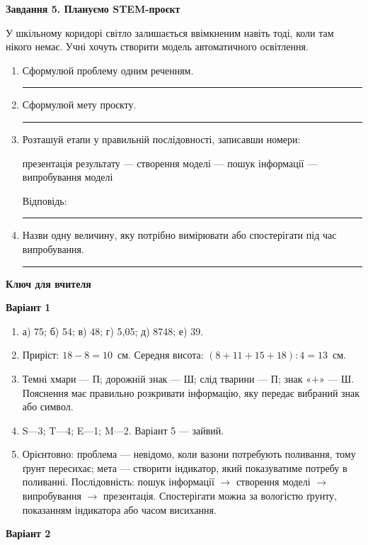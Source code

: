 \documentclass[10pt,a4paper]{article}
\newcommand{\answerline}[1]{\par\vspace{2pt}\rule{#1}{0.4pt}}
\begin{document}
\textbf{Завдання 5. Плануємо STEM-проєкт}

У шкільному коридорі світло залишається ввімкненим навіть тоді, коли там нікого немає. Учні хочуть створити модель автоматичного освітлення.

\begin{enumerate}[label=\alph*)]
  \item Сформулюй проблему одним реченням.
  \answerline{\linewidth}
  \item Сформулюй мету проєкту.
  \answerline{\linewidth}
  \item Розташуй етапи у правильній послідовності, записавши номери:

  \begin{center}
  презентація результату --- створення моделі --- пошук інформації --- випробування моделі
  \end{center}
  Відповідь: \rule{6cm}{0.4pt}
  \item Назви одну величину, яку потрібно вимірювати або спостерігати під час випробування.
  \answerline{\linewidth}
\end{enumerate}

\newpage

\begin{center}
  {\Large\bfseries Ключ для вчителя}
\end{center}

\textbf{Варіант 1}

\begin{enumerate}
  \item а) 75; б) 54; в) 48; г) 5,05; д) 8748; е) 39.
  \item Приріст: $18-8=10$~см. Середня висота: $(8+11+15+18):4=13$~см.
  \item Темні хмари --- П; дорожній знак --- Ш; слід тварини --- П; знак «$+$» --- Ш. Пояснення має правильно розкривати інформацію, яку передає вибраний знак або символ.
  \item S---3; T---4; E---1; M---2. Варіант 5 --- зайвий.
  \item Орієнтовно: проблема --- невідомо, коли вазони потребують поливання, тому ґрунт пересихає; мета --- створити індикатор, який показуватиме потребу в поливанні. Послідовність: пошук інформації $\rightarrow$ створення моделі $\rightarrow$ випробування $\rightarrow$ презентація. Спостерігати можна за вологістю ґрунту, показанням індикатора або часом висихання.
\end{enumerate}

\textbf{Варіант 2}
\end{document}
